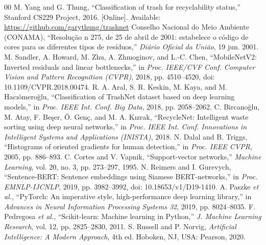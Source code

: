 \documentclass[conference]{IEEEtran}
\begin{document}
\begin{thebibliography}{00}
 M. Yang and G. Thung, ``Classification of trash for recyclability status,'' Stanford CS229 Project, 2016. [Online]. Available: \url{https://github.com/garythung/trashnet}
 Conselho Nacional do Meio Ambiente (CONAMA), ``Resolu\c{c}\~ao n\textordmasculine{} 275, de 25 de abril de 2001: estabelece o c\'odigo de cores para os diferentes tipos de res\'iduos,'' \emph{Di\'ario Oficial da Uni\~ao}, 19 jun. 2001.
 M. Sandler, A. Howard, M. Zhu, A. Zhmoginov, and L.-C. Chen, ``MobileNetV2: Inverted residuals and linear bottlenecks,'' in \emph{Proc. IEEE/CVF Conf. Computer Vision and Pattern Recognition (CVPR)}, 2018, pp. 4510--4520, doi: 10.1109/CVPR.2018.00474.
 R. A. Aral, S. R. Keskin, M. Kaya, and M. Hac\i{}\"omero\u{g}lu, ``Classification of TrashNet dataset based on deep learning models,'' in \emph{Proc. IEEE Int. Conf. Big Data}, 2018, pp. 2058--2062.
 C. Bircano\u{g}lu, M. Atay, F. Be\c{s}er, \"O. Gen\c{c}, and M. A. K\i{}zrak, ``RecycleNet: Intelligent waste sorting using deep neural networks,'' in \emph{Proc. IEEE Int. Conf. Innovations in Intelligent Systems and Applications (INISTA)}, 2018.
 N. Dalal and B. Triggs, ``Histograms of oriented gradients for human detection,'' in \emph{Proc. IEEE CVPR}, 2005, pp. 886--893.
 C. Cortes and V. Vapnik, ``Support-vector networks,'' \emph{Machine Learning}, vol. 20, no. 3, pp. 273--297, 1995.
 N. Reimers and I. Gurevych, ``Sentence-BERT: Sentence embeddings using Siamese BERT-networks,'' in \emph{Proc. EMNLP-IJCNLP}, 2019, pp. 3982--3992, doi: 10.18653/v1/D19-1410.
 A. Paszke \emph{et al.}, ``PyTorch: An imperative style, high-performance deep learning library,'' in \emph{Advances in Neural Information Processing Systems 32}, 2019, pp. 8024--8035.
 F. Pedregosa \emph{et al.}, ``Scikit-learn: Machine learning in Python,'' \emph{J. Machine Learning Research}, vol. 12, pp. 2825--2830, 2011.
 S. Russell and P. Norvig, \emph{Artificial Intelligence: A Modern Approach}, 4th ed. Hoboken, NJ, USA: Pearson, 2020.
\end{thebibliography}
\end{document}
